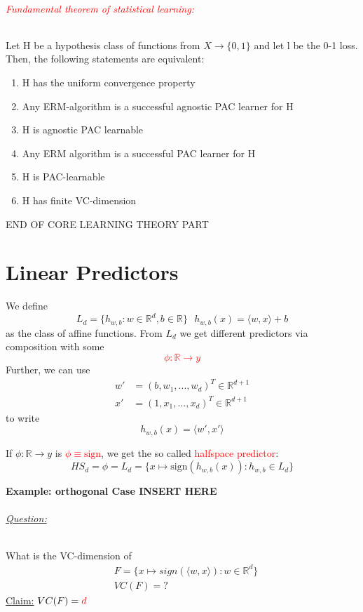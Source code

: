 \documentclass[10pt,a4paper]{article}
\theoremstyle{definition}
\theoremstyle{plain}
\begin{document}
\paragraph{\textcolor{red}{Fundamental theorem of statistical learning:}}
Let H be a hypothesis class of functions from $X \to \{ 0,1 \}$ and let l be the 0-1 loss. Then, the following statements are equivalent:
\begin{enumerate}
	\item H has the uniform convergence property
	\item Any ERM-algorithm is a successful agnostic PAC learner for H
	\item H is agnostic PAC learnable
	\item Any ERM algorithm is a successful PAC learner for H
	\item H is PAC-learnable
	\item H has finite VC-dimension
\end{enumerate}

END OF CORE LEARNING THEORY PART

\newpage

\part{Linear Predictors}
We define 
$$
	L_d = \{ h_{w,b}: w \in \mathbb{R}^d, b \in \mathbb{R}\} \ \ \ h_{w,b}(x) = \langle w,x \rangle + b
$$
as the class of affine functions. From $L_d$ we get different predictors via composition with some 
\textcolor{red}{$$
	\mathcal{\phi}: \mathbb{R} \to y
$$}
Further, we can use
\begin{align*}
	w' &= (b, w_1, ... , w_d)^T \in \mathbb{R}^{d+1}\\
	x' &= (1, x_1, ... , x_d)^T \in \mathbb{R}^{d+1}
\end{align*}
to write 
$$
	h_{w,b} (x) = \langle w', x' \rangle
$$

If $\mathcal{\phi}: \mathbb{R} \to y$ is \textcolor{red}{$\mathcal{\phi} \equiv \text{sign}$}, we get the so called \textcolor{red}{halfspace predictor}:
$$
	HS_d = \mathcal{\phi} = L_d = \{ x \mapsto \text{sign}(h_{w,b}(x)): h_{w,b} \in L_d \}
$$

\textbf{Example: orthogonal Case INSERT HERE}

\paragraph{\underline{Question:}} What is the VC-dimension of
\begin{align*}
	&F =  \{ x \mapsto sign(\langle w,x \rangle): w \in \mathbb{R}^d \}\\
	&VC(F) = ?
\end{align*}
\underline{Claim:} $VC(F) = \textcolor{red}{d}$\\
\end{document}
